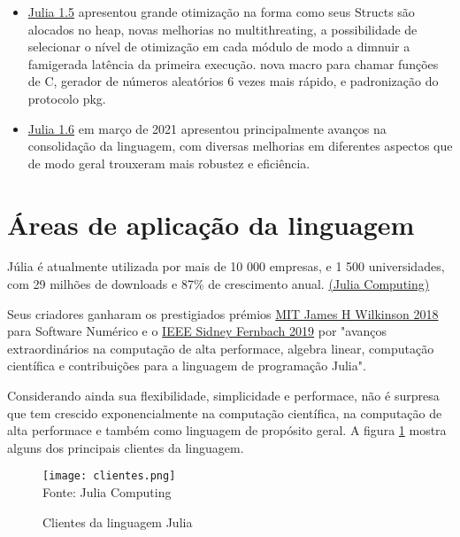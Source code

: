 \begin{itemize}
   \item\href{https://julialang.org/blog/2020/08/julia-1.5-highlights/}{Julia 1.5} apresentou grande otimização na forma como seus Structs são alocados no heap, novas melhorias no multithreating, a possibilidade de selecionar o nível de otimização em cada módulo de modo a dimnuir a famigerada latência da primeira execução. nova macro para chamar funções de C, gerador de números aleatórios 6 vezes mais rápido, e padronização do protocolo pkg. 
   \item\href{https://julialang.org/blog/2021/03/julia-1.6-highlights/}{Julia 1.6} em março de 2021 apresentou principalmente avanços na consolidação da linguagem, com diversas melhorias em diferentes aspectos que de modo geral trouxeram mais robustez e eficiência. 
\end{itemize}


\section{Áreas de aplicação da linguagem}
Júlia é atualmente utilizada por mais de 10 000 empresas, e 1 500 universidades, com 29 milhões de downloads e 87\% de  crescimento anual. \href{https://juliacomputing.com/}{(Julia Computing)}

Seus criadores ganharam os prestigiados prémios \href{https://news.mit.edu/2018/julia-language-co-creators-win-james-wilkinson-prize-numerical-software-1226}{MIT James H Wilkinson 2018} para Software Numérico e o \href{[https://www.computer.org/press-room/2019-news/2019-ieee-fernbach-award-edelman](https://www.computer.org/press-room/2019-news/2019-ieee-fernbach-award-edelman)}{IEEE Sidney Fernbach 2019} por "avanços extraordinários na computação de alta performace, algebra linear, computação científica e contribuições para a linguagem de programação Julia". 

Considerando ainda sua flexibilidade, simplicidade e performace, não é surpresa que tem crescido exponencialmente na computação científica, na computação de alta performace e também como linguagem de propósito geral. A figura \ref{clientes} mostra alguns dos principais clientes da linguagem. \cite{Klok2021}
\begin{figure}[H]
   \begin{center}
       \caption{Clientes da linguagem Julia} \label{clientes}
       \texttt{[image: clientes.png]} \\
       {\tiny \sf Fonte: Julia Computing}
   \end{center}
  \end{figure}


